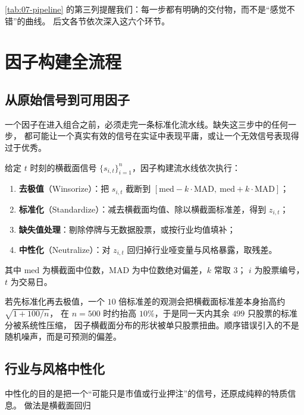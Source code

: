 \cref{tab:07-pipeline} 的第三列提醒我们：每一步都有明确的交付物，而不是“感觉不错”的曲线。
后文各节依次深入这六个环节。

\section{因子构建全流程}

\subsection{从原始信号到可用因子}

一个因子在进入组合之前，必须走完一条标准化流水线。缺失这三步中的任何一步，
都可能让一个真实有效的信号在实证中表现平庸，或让一个无效信号表现得过于优秀。

\begin{definition}[因子构建流水线]\label{def:07-pipeline}
给定 $t$ 时刻的横截面信号 $\{s_{i,t}\}_{i=1}^{n}$，因子构建流水线依次执行：
\begin{enumerate}[leftmargin=*]
  \item \textbf{去极值}（Winsorize）：把 $s_{i,t}$ 截断到 $[\mathrm{med} - k\cdot\mathrm{MAD},\ \mathrm{med} + k\cdot\mathrm{MAD}]$；
  \item \textbf{标准化}（Standardize）：减去横截面均值、除以横截面标准差，得到 $z_{i,t}$；
  \item \textbf{缺失值处理}：剔除停牌与无数据股票，或按行业均值填补；
  \item \textbf{中性化}（Neutralize）：对 $z_{i,t}$ 回归掉行业哑变量与风格暴露，取残差。
\end{enumerate}
其中 $\mathrm{med}$ 为横截面中位数，$\mathrm{MAD}$ 为中位数绝对偏差，$k$ 常取 $3$；
$i$ 为股票编号，$t$ 为交易日。
\end{definition}

\begin{warningbox}[为什么必须先去极值]
若先标准化再去极值，一个 $10$ 倍标准差的观测会把横截面标准差本身抬高约 $\sqrt{1 + 100/n}$，
在 $n=500$ 时约抬高 $10\%$，于是同一天内其余 $499$ 只股票的标准分被系统性压缩，
因子横截面分布的形状被单只股票扭曲。顺序错误引入的不是随机噪声，而是可预测的偏差。
\end{warningbox}

\subsection{行业与风格中性化}

中性化的目的是把一个“可能只是市值或行业押注”的信号，还原成纯粹的特质信息。
做法是横截面回归

